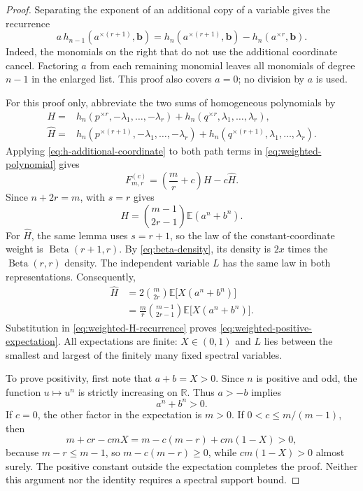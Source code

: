 \documentclass[11pt]{article}
\numberwithin{equation}{section}
\newcommand{\R}{\mathbb R}
\newcommand{\E}{\mathbb E}
\newcommand{\BetaLaw}{\operatorname{Beta}}
\begin{document}
\begin{proof}
  Separating the exponent of an additional copy of a variable gives
  the recurrence
  \begin{equation}\label{eq:h-additional-coordinate}
    a\,h_{n-1}(a^{\times(r+1)},\boldsymbol b)
      =h_n(a^{\times(r+1)},\boldsymbol b)
       -h_n(a^{\times r},\boldsymbol b).
  \end{equation}
  Indeed, the monomials on the right that do not use the additional
  coordinate cancel. Factoring $a$ from each remaining monomial
  leaves all monomials of degree $n-1$ in the enlarged list. This
  proof also covers $a=0$; no division by $a$ is used.

  For this proof only, abbreviate the two sums of homogeneous
  polynomials by
  \begin{align*}
    H={}&h_n(p^{\times r},-\lambda_1,\ldots,-\lambda_r)
          +h_n(q^{\times r},\lambda_1,\ldots,\lambda_r),\\
    \widehat H={}&h_n(p^{\times(r+1)},-\lambda_1,\ldots,-\lambda_r)
          +h_n(q^{\times(r+1)},\lambda_1,\ldots,\lambda_r).
  \end{align*}
  Applying \eqref{eq:h-additional-coordinate} to both path terms
  in \eqref{eq:weighted-polynomial} gives
  \begin{equation}\label{eq:weighted-H-recurrence}
    F^{(c)}_{m,r}=\left(\frac mr+c\right)H-c\widehat H.
  \end{equation}
  Since $n+2r=m$,  with $s=r$ gives
  \[
    H=\binom{m-1}{2r-1}\E(a^n+b^n).
  \]
  For $\widehat H$, the same lemma uses $s=r+1$, so the law of
  the constant-coordinate weight is $\BetaLaw(r+1,r)$. By
  \eqref{eq:beta-density}, its density is $2x$ times the
  $\BetaLaw(r,r)$ density. The independent variable $L$ has the
  same law in both representations. Consequently,
  \begin{align*}
    \widehat H
      &=2\binom m{2r}\E\bigl[X(a^n+b^n)\bigr]\\
      &=\frac mr\binom{m-1}{2r-1}
          \E\bigl[X(a^n+b^n)\bigr].
  \end{align*}
  Substitution in \eqref{eq:weighted-H-recurrence} proves
  \eqref{eq:weighted-positive-expectation}. All expectations are
  finite: $X\in(0,1)$ and $L$ lies between the smallest and largest
  of the finitely many fixed spectral variables.

  To prove positivity, first note that $a+b=X>0$. Since $n$ is
  positive and odd, the function $u\mapsto u^n$ is strictly
  increasing on $\R$. Thus $a>-b$ implies
  \[
    a^n+b^n>0.
  \]
  If $c=0$, the other factor in the expectation is $m>0$.
  If $0<c\le m/(m-1)$, then
  \[
    m+cr-cmX
      =m-c(m-r)+cm(1-X)>0,
  \]
  because $m-r\le m-1$, so $m-c(m-r)\ge0$, while
  $cm(1-X)>0$ almost surely. The positive constant outside the
  expectation completes the proof. Neither this argument nor the
  identity requires a spectral support bound.
\end{proof}
\end{document}

